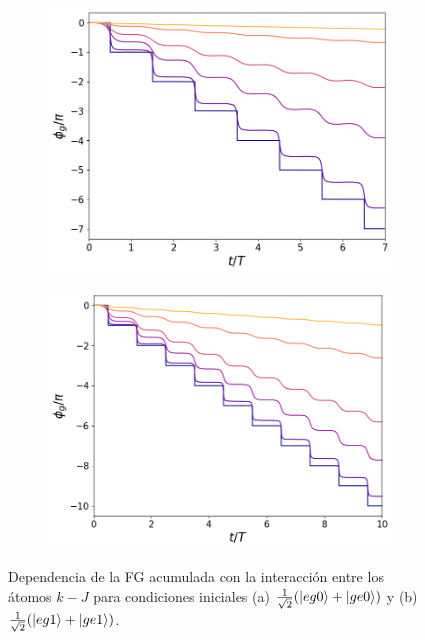 \begin{figure}[h]
    \centering
    \begin{subfigure}{0.49\textwidth}
        \includegraphics[width=\textwidth]{figuras/ch5/dependencia/eg0+/interaccion todo 0.png}
        \caption{}
        \label{fig5:dependencia interaccion eg0}
    \end{subfigure}
    \hfill
    \begin{subfigure}{0.49\textwidth}
        \includegraphics[width=\textwidth]{figuras/ch5/dependencia/eg1+/interaccion todo 0.png}
        \caption{}
        \label{fig5:dependencia interaccion eg1}
    \end{subfigure}
    \caption{Dependencia de la FG acumulada con la interacción entre los átomos $k-J$ para condiciones iniciales (a) $\frac{1}{\sqrt{2}}(\ket{eg0}+\ket{ge0})$ y (b) $\frac{1}{\sqrt{2}}(\ket{eg1}+\ket{ge1})$.}
    \label{fig5:dependencia interaccion}
\end{figure}
